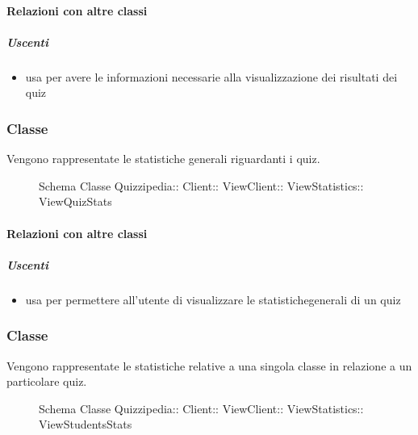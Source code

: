 \paragraph{Relazioni con altre classi}
\subparagraph{Uscenti}
\begin{itemize}
\item usa  per avere le informazioni necessarie alla visualizzazione dei risultati dei quiz
\end{itemize}
\subsubsection{Classe }
Vengono rappresentate le statistiche generali riguardanti i quiz.
\begin{figure}[H]
\centering
\noindent{}
\caption[Schema Classe ViewQuizStats]{Schema Classe Quizzipedia:: Client:: ViewClient:: ViewStatistics:: ViewQuizStats}
\end{figure}
\paragraph{Relazioni con altre classi}
\subparagraph{Uscenti}
\begin{itemize}
\item usa  per permettere all'utente di visualizzare le statistichegenerali di un quiz
\end{itemize}
\subsubsection{Classe }
Vengono rappresentate le statistiche relative a una singola classe in relazione a un particolare quiz.
\begin{figure}[H]
\centering
\noindent{}
\caption[Schema Classe ViewStudentsStats]{Schema Classe Quizzipedia:: Client:: ViewClient:: ViewStatistics:: ViewStudentsStats}
\end{figure}
